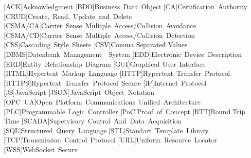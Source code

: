   \begin{acronym}
    [ACK]{Acknowledgment}
    [BDO]{Business Data Object}
    [CA]{Certification Authority}
    [CRUD]{Create, Read, Update and Delete}
    [CSMA/CA]{Carrier Sense Multiple Access/Collision Avoidance}
    [CSMA/CD]{Carrier Sense Multiple Access/Collision Detection}
    [CSS]{Cascading Style Sheets}
    [CSV]{Comma Separated Values}
    [DBMS]{Datenbank Management  System}
    [EDD]{Electronic Device Description}
    [ERD]{Entity Relationship Diagram}
    [GUI]{Graphical User Interface}
    [HTML]{Hypertext Markup Language}
    [HTTP]{Hypertext Transfer Protocol}
    [HTTPS]{Hypertext Transfer Protocol Secure}
    [IP]{Internet Protocol}
    [JS]{JavaScript}
    [JSON]{JavaScript Object Notation}
    [OPC UA]{Open Platform Communications Unified Architecture}
    [PLC]{Programmable Logic Controller}
    [PoC]{Proof of Concept}
    [RTT]{Round Trip Time}
    [SCADA]{Supervisory Control And Data Acquisition}
    [SQL]{Structured Query Language}
    [STL]{Standart Template Library}
    [TCP]{Transmission Control Protocol}
    [URL]{Uniform Resource Locator}
    [WSS]{WebSocket Secure}
  \end{acronym}
